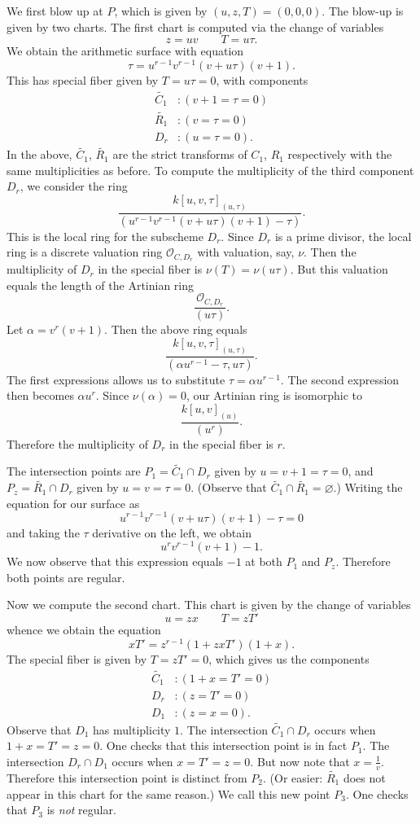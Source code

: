 \documentclass[pagesize,paper=letter]{scrartcl}
\theoremstyle{plain}
\theoremstyle{definition}
\theoremstyle{remark}
\renewcommand{\emptyset}{\varnothing}
\renewcommand{\tilde}[1]{\widetilde{#1}}
\newcommand{\sO}{\ensuremath{\mathscr{O}}}
\begin{document}
We first blow up at $P$, which is given by $(u,z,T) = (0,0,0)$. The blow-up is given by two charts. The first chart is computed via the change of variables
\[
z = uv \qquad T = u\tau.
\]
We obtain the arithmetic surface with equation
\[
\tau = u^{r-1}v^{r-1}(v + u\tau)(v + 1).
\]
This has special fiber given by $T = u\tau = 0$, with components
\begin{align*}
  \tilde{C_1}&: (v + 1 = \tau = 0) \\
  \tilde{R_1}&: (v = \tau = 0) \\
  D_r&: (u = \tau = 0).
\end{align*}
In the above, $\tilde{C_1}$, $\tilde{R_1}$ are the strict transforms of $C_1$, $R_1$ respectively with the same multiplicities as before. To compute the multiplicity of the third component $D_r$, we consider the ring
\[
\frac{k[u,v,\tau]_{(u,\tau)}}{(u^{r-1}v^{r-1}(v + u\tau)(v + 1) - \tau)}.
\]
This is the local ring for the subscheme $D_r$. Since $D_r$ is a prime divisor, the local ring is a discrete valuation ring $\sO_{C,D_r}$ with valuation, say, $\nu$. Then the multiplicity of $D_r$ in the special fiber is $\nu(T) = \nu(u\tau)$. But this valuation equals the length of the Artinian ring
\[
\frac{\sO_{C,D_r}}{(u\tau)}.
\]
Let $\alpha = v^{r}(v+1)$. Then the above ring equals
\[
\frac{k[u,v,\tau]_{(u,\tau)}}{(\alpha u^{r-1} - \tau, u\tau)}.
\]
The first expressions allows us to substitute $\tau = \alpha u^{r-1}$. The second expression then becomes $\alpha u^r$. Since $\nu(\alpha) = 0$, our Artinian ring is isomorphic to
\[
\frac{k[u,v]_{(u)}}{(u^r)}.
\]
Therefore the multiplicity of $D_r$ in the special fiber is $r$.

The intersection points are $P_1 = \tilde{C_1} \cap D_r$ given by $u=v+1=\tau=0$, and $P_z = \tilde{R_1} \cap D_r$ given by $u=v=\tau=0$. (Observe that $\tilde{C_1} \cap \tilde{R_1} = \emptyset$.) Writing the equation for our surface as
\[
u^{r-1}v^{r-1}(v + u\tau)(v + 1) - \tau = 0
\]
and taking the $\tau$ derivative on the left, we obtain
\[
u^rv^{r-1}(v + 1) - 1.
\]
We now observe that this expression equals $-1$ at both $P_1$ and $P_z$. Therefore both points are regular.

Now we compute the second chart. This chart is given by the change of variables
\[
u=zx \qquad T=zT'
\]
whence we obtain the equation
\[
xT' = z^{r-1}(1 + zxT')(1 + x).
\]
The special fiber is given by $T = zT' = 0$, which gives us the components
\begin{align*}
  \tilde{C_1}&: (1 + x = T' = 0) \\
  D_r&: (z = T' = 0) \\
  D_1&: (z = x = 0).
\end{align*}
Observe that $D_1$ has multiplicity $1$. The intersection $\tilde{C_1} \cap D_r$ occurs when $1 + x = T' = z = 0$. One checks that this intersection point is in fact $P_1$. The intersection $D_r \cap D_1$ occurs when $x = T' = z = 0$. But now note that $x = \frac{1}{v}$. Therefore this intersection point is distinct from $P_2$. (Or easier: $\tilde{R_1}$ does not appear in this chart for the same reason.) We call this new point $P_3$. One checks that $P_3$ is \emph{not} regular.
\end{document}
